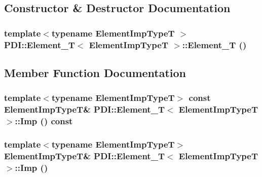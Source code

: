 \subsection{Constructor \& Destructor Documentation}
\hypertarget{class_p_d_i_1_1_element___t_7796396b8a0e0d5574aa400fbfe59b09}{
\subsubsection[{Element\_\-T}]{\setlength{\rightskip}{0pt plus 5cm}template$<$typename ElementImpTypeT $>$ {\bf PDI::Element\_\-T}$<$ ElementImpTypeT $>$::{\bf Element\_\-T} ()}}
\label{class_p_d_i_1_1_element___t_7796396b8a0e0d5574aa400fbfe59b09}




\subsection{Member Function Documentation}
\hypertarget{class_p_d_i_1_1_element___t_ab103fde8c88e45b9734418e6af3c9c0}{
\subsubsection[{Imp}]{\setlength{\rightskip}{0pt plus 5cm}template$<$typename ElementImpTypeT$>$ const ElementImpTypeT\& {\bf PDI::Element\_\-T}$<$ ElementImpTypeT $>$::Imp () const}}
\label{class_p_d_i_1_1_element___t_ab103fde8c88e45b9734418e6af3c9c0}


\hypertarget{class_p_d_i_1_1_element___t_f4ad2ab4d78c0b363b46d6175efefe83}{
\subsubsection[{Imp}]{\setlength{\rightskip}{0pt plus 5cm}template$<$typename ElementImpTypeT$>$ ElementImpTypeT\& {\bf PDI::Element\_\-T}$<$ ElementImpTypeT $>$::Imp ()}}
\label{class_p_d_i_1_1_element___t_f4ad2ab4d78c0b363b46d6175efefe83}


